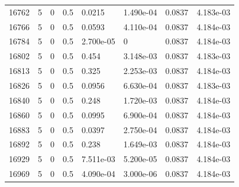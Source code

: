 \documentclass[preview]{standalone}
\begin{document}
{{{{{{{{{{{{{{{{{{\begin{tabular}{L{1.2cm}C{1.2cm} C{0.3cm}C{0.5cm} C{1.4cm}C{1.4cm} C{1.4cm}C{1.4cm}}
  16762  &     5  & 0     & 0.5 &  0.0215  & 1.490e-04  & 0.0837 &  4.183e-03   \\ 
  16766  &     5  & 0     & 0.5 &  0.0593  & 4.110e-04  & 0.0837 &  4.184e-03   \\ 
  16784  &     5  & 0     & 0.5 &  2.700e-05  & 0  & 0.0837 &  4.184e-03   \\ 
  16802  &     5  & 0     & 0.5 &  0.454  & 3.148e-03  & 0.0837 &  4.183e-03   \\ 
  16813  &     5  & 0     & 0.5 &  0.325  & 2.253e-03  & 0.0837 &  4.184e-03   \\ 
  16826  &     5  & 0     & 0.5 &  0.0956  & 6.630e-04  & 0.0837 &  4.183e-03   \\ 
  16840  &     5  & 0     & 0.5 &  0.248  & 1.720e-03  & 0.0837 &  4.184e-03   \\ 
  16860  &     5  & 0     & 0.5 &  0.0995  & 6.900e-04  & 0.0837 &  4.184e-03   \\ 
  16883  &     5  & 0     & 0.5 &  0.0397  & 2.750e-04  & 0.0837 &  4.184e-03   \\ 
  16892  &     5  & 0     & 0.5 &  0.238  & 1.649e-03  & 0.0837 &  4.184e-03   \\ 
  16929  &     5  & 0     & 0.5 &  7.511e-03  & 5.200e-05  & 0.0837 &  4.184e-03   \\ 
  16969  &     5  & 0     & 0.5 &  4.090e-04  & 3.000e-06  & 0.0837 &  4.184e-03   \\ 
\hline 
\end{tabular} 

}}}}}}}}}}}}}}}}}}
\end{document}
